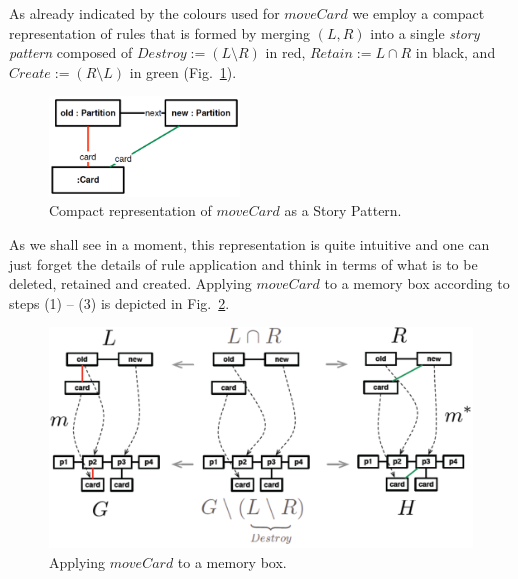 \clearpage

As already indicated by the colours used for $moveCard$ we employ a compact
representation of rules that is formed by merging $(L,R)$ into a single
\emph{story pattern} composed of  $Destroy := (L\setminus R)$ in red, $Retain := 
L\cap R$ in black, and $Create := (R\setminus L)$ in  green
(Fig.~\ref{fig:rule_compact}).
\begin{figure}[htp]
\begin{center}
  \includegraphics[width=0.45\textwidth]{pics/rule_compact}
  \caption[]{Compact representation of $moveCard$ as a Story Pattern.}
  \label{fig:rule_compact}
\end{center}
\end{figure}

 As we shall see in a moment, this  representation is quite intuitive and one can
just forget the details of rule application and think in terms of what is to be
deleted, retained and created. Applying $moveCard$ to a memory box according to
steps (1) -- (3) is depicted in Fig.~\ref{fig:rule_app_example}.

\begin{figure}[htp] 
\begin{center}
  \includegraphics[width=\textwidth]{pics/rule_app_example}
  \caption[]{Applying $moveCard$ to a memory box.}
  \label{fig:rule_app_example}
\end{center}
\end{figure}

